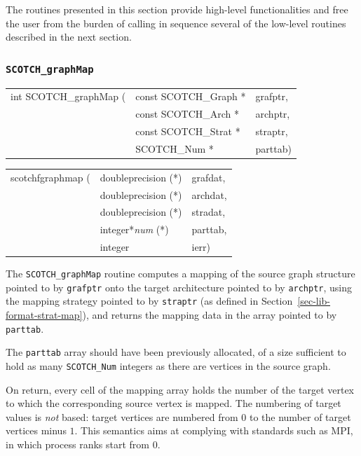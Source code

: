 The routines presented in this section provide high-level
functionalities and free the user from the burden of calling in
sequence several of the low-level routines described in the next
section.

\subsubsection{{\tt SCOTCH\_graphMap}}
\label{sec-lib-func-graphmap}

\begin{itemize}
\progsyn

{\tt\begin{tabular}{l@{}ll}
int SCOTCH\_graphMap ( & const SCOTCH\_Graph * & grafptr, \\
                       & const SCOTCH\_Arch *  & archptr, \\
                       & const SCOTCH\_Strat * & straptr, \\
                       & SCOTCH\_Num *         & parttab)
\end{tabular}}

{\tt\begin{tabular}{l@{}ll}
scotchfgraphmap ( & doubleprecision (*)   & grafdat, \\
                  & doubleprecision (*)   & archdat, \\
                  & doubleprecision (*)   & stradat, \\
                  & integer*{\it num} (*) & parttab, \\
                  & integer               & ierr)
\end{tabular}}

\progdes

The {\tt SCOTCH\_graphMap} routine computes a mapping of the source
graph structure pointed to by {\tt grafptr} onto the target
architecture pointed to by {\tt archptr}, using the mapping strategy
pointed to by {\tt straptr} (as defined in
Section~\ref{sec-lib-format-strat-map}), and returns the mapping data
in the array pointed to by {\tt parttab}.

The {\tt parttab} array should have been previously allocated, of a
size sufficient to hold as many {\tt SCOTCH\_\lbt Num} integers as
there are vertices in the source graph.

On return, every cell of the mapping array holds the number of the
target vertex to which the corresponding source vertex is mapped.
The numbering of target values is {\em not\/} based: target vertices
are numbered from $0$ to the number of target vertices minus $1$.
This semantics aims at complying with standards such as MPI, in
which process ranks start from $0$.


\end{itemize}
